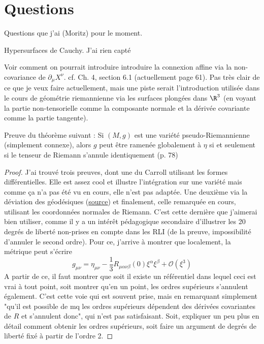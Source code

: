 \chapter{Questions}
Questions que j'ai (Moritz) pour le moment.
\begin{quest}
    Hypersurfaces de Cauchy. J'ai rien capté
\end{quest}
\begin{quest}
    Voir comment on pourrait introduire introduire la connexion affine via la non-covariance de $\partial_\mu X^\nu$. cf. Ch. 4, section 6.1 (actuellement page 61). Pas très clair de ce que je veux faire actuellement, mais une piste serait l'introduction utilisée dans le cours de géométrie riemannienne via les surfaces plongées dans $\R^3$ (en voyant la partie non-tensorielle comme la composante normale et la dérivée covariante comme la partie tangente).
\end{quest}
\begin{quest}
    Preuve du théorème suivant : Si $(M,g)$ est une variété pseudo-Riemannienne (simplement connexe), alors $g$ peut être ramenée globalement à $\eta$ si et seulement si le tenseur de Riemann s'annule identiquement (p. 78)
\end{quest}
\begin{proof}
    J'ai trouvé trois preuves, dont une du Carroll utilisant les formes différentielles. Elle est assez cool et illustre l'intégration sur une variété mais comme ça n'a pas été vu en cours, elle n'est pas adaptée. Une deuxième via la déviation des géodésiques (\href{https://www.frontiersin.org/journals/physics/articles/10.3389/fphy.2013.00012/full}{source}) et finalement, celle remarquée en cours, utilisant les coordonnées normales de Riemann. C'est cette dernière que j'aimerai bien utiliser, comme il y a un intérêt pédagogique secondaire d'illustrer les 20 degrés de liberté non-prises en compte dans les RLI (de la preuve, impossibilité d'annuler le second ordre). Pour ce, j'arrive à montrer que localement, la métrique peut s'écrire
    \begin{equation}
        g_{\mu\nu} = \eta_{\mu\nu} - \frac{1}{3} R_{\mu \alpha\nu \beta}(0) \xi^\alpha \xi^\beta + \mathcal{O}(\xi^3) 
    \end{equation}
    A partir de ce, il faut montrer que soit il existe un référentiel dans lequel ceci est vrai à tout point, soit montrer qu'en un point, les ordres supérieurs s'annulent également. C'est cette voie qui est souvent prise, mais en remarquant simplement "qu'il est possible de mq les ordres supérieurs dépendent des dérivées covariantes de $R$ et s'annulent donc", qui n'est pas satisfaisant. Soit, expliquer un peu plus en détail comment obtenir les ordres supérieurs, soit faire un argument de degrés de liberté fixé à partir de l'ordre 2. 
\end{proof}
